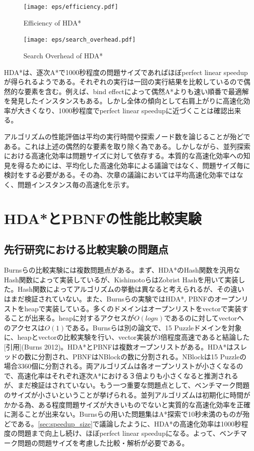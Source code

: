 \documentclass{jsarticle}
\begin{document}
\begin{figure}
	\centering
	\texttt{[image: eps/efficiency.pdf]}	
	\label{fig:david_speedup}
	\caption{Efficiency of HDA*}
\end{figure}
\begin{figure}
	\centering
	\texttt{[image: eps/search\_overhead.pdf]}	
	\label{fig:david_so}
	\caption{Search Overhead of HDA*}
\end{figure}

HDA*は、逐次A*で1000秒程度の問題サイズであればほぼperfect linear speedupが得られるようである。それぞれの実行は一回の実行結果を比較しているので偶然的な要素を含む。例えば、bind effectによって偶然A*よりも速い順番で最適解を発見したインスタンスもある。しかし全体の傾向として右肩上がりに高速化効率が大きくなり、1000秒程度でperfect linear speedupに近づくことは確認出来る。

アルゴリズムの性能評価は平均の実行時間や探索ノード数を論じることが殆どである。これは上述の偶然的な要素を取り除く為である。しかしながら、並列探索における高速化効率は問題サイズに対して依存する。本質的な高速化効率への知見を得るためには、平均化した高速化効率による議論ではなく、問題サイズ毎に検討をする必要がある。その為、次章の議論においては平均高速化効率ではなく、問題インスタンス毎の高速化を示す。


\section{HDA*とPBNFの性能比較実験}
\label{ch:analysis2}

\subsection{先行研究における比較実験の問題点}

Burnsらの比較実験には複数問題点がある\cite{Burns2010}。まず、HDA*のHash関数を汎用なHash関数によって実装しているが、KishimotoらはZobrist Hashを用いて実装した。Hash関数によってアルゴリズムの挙動は異なると考えられるが、その違いはまだ検証されていない。また、Burnsらの実験ではHDA*, PBNFのオープンリストをheapで実装している。多くのドメインはオープンリストをvectorで実装することが出来る。heapに対するアクセスが$O(logn)$であるのに対してvectorへのアクセスは$O(1)$である。Burnsらは別の論文で、15 Puzzleドメインを対象に、heapとvectorの比較実験を行い、vector実装が3倍程度高速であると結論した[引用](Burns 2012)。HDA*とPBNFは複数オープンリストがある。HDA*はスレッドの数に分割され、PBNFはNBlockの数に分割される。NBlockは15 Puzzleの場合3360個に分割される。両アルゴリズムは各オープンリストが小さくなるので、高速化率はそれぞれ逐次A*における３倍よりも小さくなると推測されるが、まだ検証はされていない。もう一つ重要な問題点として、ベンチマーク問題のサイズが小さいということが挙げられる。並列アルゴリズムは初期化に時間がかかる為、ある程度問題サイズが大きいものでないと実質的な高速化効率を正確に測ることが出来ない。Burnsらの用いた問題集はA*探索で10秒未満のものが殆どである。\ref{sec:speedup_size}で議論したように、HDA*の高速化効率は1000秒程度の問題まで向上し続け、ほぼperfect linear speedupになる。よって、ベンチマーク問題の問題サイズを考慮した比較・解析が必要である。
\end{document}

